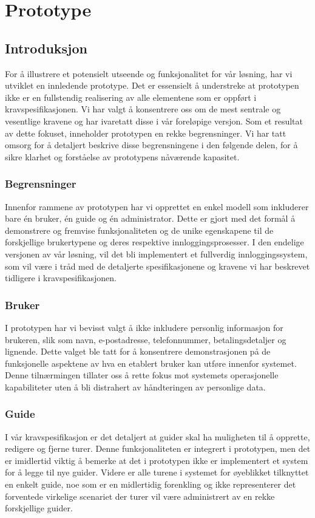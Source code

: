 \documentclass[../doc]{subfiles}
\begin{document}
\section{Prototype}
\subsection{Introduksjon}
For å illustrere et potensielt utseende og funksjonalitet for vår løsning, har vi utviklet en innledende prototype. Det er essensielt å understreke at prototypen ikke er en fullstendig realisering av alle elementene som er oppført i kravspesifikasjonen. Vi har valgt å konsentrere oss om de mest sentrale og vesentlige kravene og har ivaretatt disse i vår foreløpige versjon. Som et resultat av dette fokuset, inneholder prototypen en rekke begrensninger. Vi har tatt omsorg for å detaljert beskrive disse begrensningene i den følgende delen, for å sikre klarhet og forståelse av prototypens nåværende kapasitet.

\subsubsection{Begrensninger}
Innenfor rammene av prototypen har vi opprettet en enkel modell som inkluderer bare én bruker, én guide og én administrator. Dette er gjort med det formål å demonstrere og fremvise funksjonaliteten og de unike egenskapene til de forskjellige brukertypene og deres respektive innloggingsprosesser. I den endelige versjonen av vår løsning, vil det bli implementert et fullverdig innloggingssystem, som vil være i tråd med de detaljerte spesifikasjonene og kravene vi har beskrevet tidligere i kravspesifikasjonen.

\subsubsection*{Bruker}
I prototypen har vi bevisst valgt å ikke inkludere personlig informasjon for brukeren, slik som navn, e-postadresse, telefonnummer, betalingsdetaljer og lignende. Dette valget ble tatt for å konsentrere demonstrasjonen på de funksjonelle aspektene av hva en etablert bruker kan utføre innenfor systemet. Denne tilnærmingen tillater oss å rette fokus mot systemets operasjonelle kapabiliteter uten å bli distrahert av håndteringen av personlige data.

\subsubsection*{Guide}    
I vår kravspesifikasjon er det detaljert at guider skal ha muligheten til å opprette, redigere og fjerne turer. Denne funksjonaliteten er integrert i prototypen, men det er imidlertid viktig å bemerke at det i prototypen ikke er implementert et system for å legge til nye guider. Videre er alle turene i systemet for øyeblikket tilknyttet en enkelt guide, noe som er en midlertidig forenkling og ikke representerer det forventede virkelige scenariet der turer vil være administrert av en rekke forskjellige guider.
\end{document}
